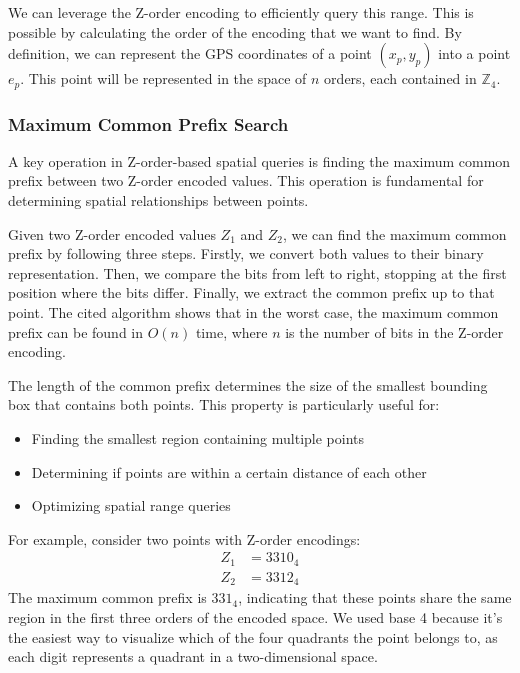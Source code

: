 We can leverage the Z-order encoding to efficiently query this range. This is possible by calculating the order of the encoding that we want to find. 
By definition, we can represent the GPS coordinates of a point \( (x_p, y_p) \) into a point \( e_p \). This point will be represented in the space of \( n \) orders, each contained in \( \mathbb{Z}_4 \).

\subsubsection{Maximum Common Prefix Search}
A key operation in Z-order-based spatial queries is finding the maximum common prefix between two Z-order encoded values. This operation is fundamental for determining spatial relationships between points.

Given two Z-order encoded values \( Z_1 \) and \( Z_2 \), we can find the maximum common prefix by following three steps. Firstly, we convert both values to their binary representation. Then, we compare the bits from left to right, stopping at the first position where the bits differ. Finally, we extract the common prefix up to that point. The cited algorithm shows that in the worst case, the maximum common prefix can be found in \( O(n) \) time, where \( n \) is the number of bits in the Z-order encoding.

The length of the common prefix determines the size of the smallest bounding box that contains both points. This property is particularly useful for:
\begin{itemize}
    \item Finding the smallest region containing multiple points
    \item Determining if points are within a certain distance of each other
    \item Optimizing spatial range queries
\end{itemize}

For example, consider two points with Z-order encodings:
\begin{align*}
    Z_1 &= 3310_4 \\
    Z_2 &= 3312_4
\end{align*}
The maximum common prefix is \( 331_4 \), indicating that these points share the same region in the first three orders of the encoded space. We used base 4 because it's the easiest way to visualize which of the four quadrants the point belongs to, as each digit represents a quadrant in a two-dimensional space.

